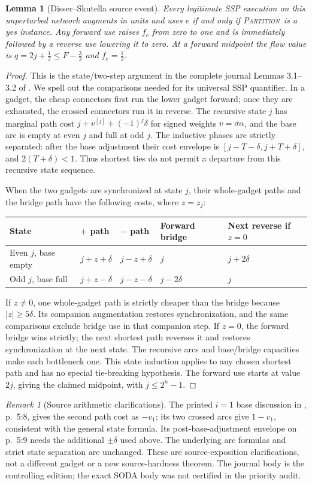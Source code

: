\documentclass[11pt]{article}
\newtheorem{lemma}[theorem]{Lemma}
\theoremstyle{remark}\newtheorem{remark}[theorem]{Remark}
\newcommand{\PART}{\textsc{Partition}}
\begin{document}
\begin{lemma}[Disser--Skutella source event]\label{lem:source}
Every legitimate SSP execution on this unperturbed network augments in units and uses $e$ if and only if \PART\ is a yes instance. Any forward use raises $f_e$ from zero to one and is immediately followed by a reverse use lowering it to zero. At a forward midpoint the flow value is $q=2j+\tfrac12\le F-\tfrac32$ and $f_e=\tfrac12$.
\end{lemma}
\begin{proof}
This is the state/two-step argument in the complete journal Lemmas 3.1--3.2 of \cite{ds}. We spell out the comparisons needed for its universal SSP quantifier. In a gadget, the cheap connectors first run the lower gadget forward; once they are exhausted, the crossed connectors run it in reverse. The recursive state $j$ has marginal path cost $j+v^{[j]}+(-1)^j\delta$ for signed weights $v=\sigma\alpha$, and the base arc is empty at even $j$ and full at odd $j$. The inductive phases are strictly separated: after the base adjustment their cost envelope is $[j-T-\delta,j+T+\delta]$, and $2(T+\delta)<1$. Thus shortest ties do not permit a departure from this recursive state sequence.

When the two gadgets are synchronized at state $j$, their whole-gadget paths and the bridge path have the following costs, where $z=z_j$:
\begin{center}
\begin{tabular}{lllll}
\toprule
State & $+$ path & $-$ path & Forward bridge & Next reverse if $z=0$\\\midrule
Even $j$, base empty & $j+z+\delta$ & $j-z+\delta$ & $j$ & $j+2\delta$\\
Odd $j$, base full & $j+z-\delta$ & $j-z-\delta$ & $j-2\delta$ & $j$\\\bottomrule
\end{tabular}
\end{center}
If $z\ne0$, one whole-gadget path is strictly cheaper than the bridge because $|z|\ge5\delta$. Its companion augmentation restores synchronization, and the same comparisons exclude bridge use in that companion step. If $z=0$, the forward bridge wins strictly; the next shortest path reverses it and restores synchronization at the next state. The recursive arcs and base/bridge capacities make each bottleneck one. This state induction applies to any chosen shortest path and has no special tie-breaking hypothesis. The forward use starts at value $2j$, giving the claimed midpoint, with $j\le2^n-1$.
\end{proof}
\begin{remark}[Source arithmetic clarifications]
The printed $i=1$ base discussion in \cite{ds}, p.~5:8, gives the second path cost as $-v_1$; its two crossed arcs give $1-v_1$, consistent with the general state formula. Its post-base-adjustment envelope on p.~5:9 needs the additional $\pm\delta$ used above. The underlying arc formulas and strict state separation are unchanged. These are source-exposition clarifications, not a different gadget or a new source-hardness theorem. The journal body is the controlling edition; the exact SODA body was not certified in the priority audit.
\end{remark}
\end{document}
